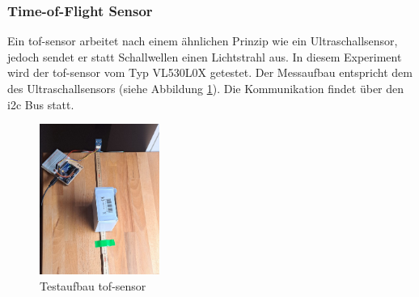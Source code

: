 \documentclass[../main.tex]{subfiles}
\begin{document}
\newpage
\subsubsection{Time-of-Flight Sensor}
Ein \acrfull{tof-sensor} arbeitet nach einem ähnlichen Prinzip wie ein Ultraschallsensor, jedoch sendet er statt Schallwellen einen Lichtstrahl aus. In diesem Experiment wird der \acrshort{tof-sensor} vom Typ VL530L0X getestet. Der Messaufbau entspricht dem des Ultraschallsensors (siehe Abbildung \ref{fig:TOF1}). Die Kommunikation findet über den \gls{i2c} Bus statt.

\begin{figure}[h!] %
    \centering
    \includegraphics[width=0.35\textwidth]{img/sensortest/MA_TOF.jpg} %
    \caption{Testaufbau \acrshort{tof-sensor}}
    \label{fig:TOF1} %
\end{figure}
\end{document}
